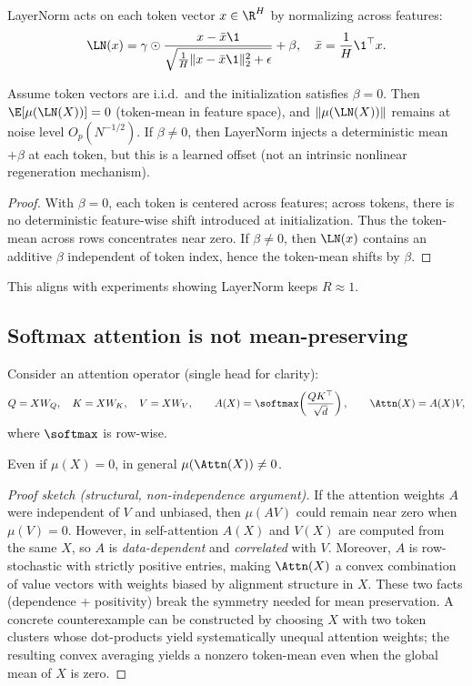 LayerNorm acts on each token vector $x\in\R^H$ by normalizing across features:
\[
\LN(x) = \gamma \odot \frac{x-\bar{x}\1}{\sqrt{\frac{1}{H}\|x-\bar{x}\1\|_2^2+\epsilon}} + \beta,
\quad \bar{x}=\frac{1}{H}\1^\top x.
\]

\begin{proposition}
\label{prop:layernorm_neutral}
Assume token vectors are i.i.d.\ and the initialization satisfies $\beta=0$.
Then $\E[\mu(\LN(X))]=0$ (token-mean in feature space), and $\|\mu(\LN(X))\|$ remains at noise level $O_p(N^{-1/2})$.
If $\beta\neq 0$, then LayerNorm injects a deterministic mean $+\beta$ at each token, but this is a learned offset (not an intrinsic nonlinear regeneration mechanism).
\end{proposition}

\begin{proof}
With $\beta=0$, each token is centered across features; across tokens, there is no deterministic feature-wise shift introduced at initialization.
Thus the token-mean across rows concentrates near zero.
If $\beta\neq 0$, then $\LN(x)$ contains an additive $\beta$ independent of token index, hence the token-mean shifts by $\beta$.
\end{proof}

This aligns with experiments showing LayerNorm keeps $R\approx 1$.

\subsection{Softmax attention is not mean-preserving}

Consider an attention operator (single head for clarity):
\[
Q = XW_Q,\quad K=XW_K,\quad V=XW_V,
\qquad
A(X)=\softmax\!\left(\frac{QK^\top}{\sqrt{d}}\right),
\qquad
\Attn(X)=A(X)V,
\]
where $\softmax$ is row-wise.

\begin{proposition}
\label{prop:attn_nonpreserve}
Even if $\mu(X)=0$, in general $\mu(\Attn(X))\neq 0$.
\end{proposition}

\begin{proof}[Proof sketch (structural, non-independence argument)]
If the attention weights $A$ were independent of $V$ and unbiased, then $\mu(A V)$ could remain near zero when $\mu(V)=0$.
However, in self-attention $A(X)$ and $V(X)$ are computed from the same $X$, so $A$ is \emph{data-dependent} and \emph{correlated} with $V$.
Moreover, $A$ is row-stochastic with strictly positive entries, making $\Attn(X)$ a convex combination of value vectors with weights biased by alignment structure in $X$.
These two facts (dependence + positivity) break the symmetry needed for mean preservation.
A concrete counterexample can be constructed by choosing $X$ with two token clusters whose dot-products yield systematically unequal attention weights; the resulting convex averaging yields a nonzero token-mean even when the global mean of $X$ is zero.
\end{proof}

